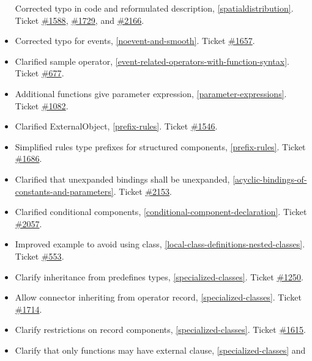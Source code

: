 \documentclass[../MLS.tex]{subfiles}
\begin{document}
\begin{itemize}
  Corrected typo in code and reformulated description, \autoref{spatialdistribution}.
  Ticket \href{https://trac.modelica.org/Modelica/ticket/1588}{\#1588},
  \href{https://trac.modelica.org/Modelica/ticket/1729}{\#1729}, and
  \href{https://trac.modelica.org/Modelica/ticket/2166}{\#2166}.
\item
  Corrected typo for events, \autoref{noevent-and-smooth}. Ticket
  \href{https://trac.modelica.org/Modelica/ticket/1657}{\#1657}.
\item
  Clarified sample operator, \autoref{event-related-operators-with-function-syntax}. Ticket
  \href{https://trac.modelica.org/Modelica/ticket/677}{\#677}.
\item
  Additional functions give parameter expression, \autoref{parameter-expressions}. Ticket
  \href{https://trac.modelica.org/Modelica/ticket/1082}{\#1082}.
\item
  Clarified ExternalObject, \autoref{prefix-rules}. Ticket
  \href{https://trac.modelica.org/Modelica/ticket/1546}{\#1546}.
\item
  Simplified rules type prefixes for structured components, \autoref{prefix-rules}. Ticket
  \href{https://trac.modelica.org/Modelica/ticket/1686}{\#1686}.
\item
  Clarified that unexpanded bindings shall be unexpanded, \autoref{acyclic-bindings-of-constants-and-parameters}.
  Ticket \href{https://trac.modelica.org/Modelica/ticket/2153}{\#2153}.
\item
  Clarified conditional components, \autoref{conditional-component-declaration}. Ticket
  \href{https://trac.modelica.org/Modelica/ticket/2057}{\#2057}.
\item
  Improved example to avoid using class, \autoref{local-class-definitions-nested-classes}. Ticket
  \href{https://trac.modelica.org/Modelica/ticket/553}{\#553}.
\item
  Clarify inheritance from predefines types, \autoref{specialized-classes}. Ticket
  \href{https://trac.modelica.org/Modelica/ticket/1250}{\#1250}.
\item
  Allow connector inheriting from operator record, \autoref{specialized-classes}. Ticket
  \href{https://trac.modelica.org/Modelica/ticket/1714}{\#1714}.
\item
  Clarify restrictions on record components, \autoref{specialized-classes}. Ticket
  \href{https://trac.modelica.org/Modelica/ticket/1615}{\#1615}.
\item
  Clarify that only functions may have external clause, \autoref{specialized-classes} and

\end{itemize}
\end{document}
